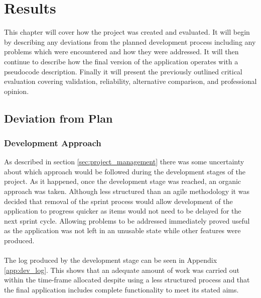 \section{Results}
	This chapter will cover how the project was created and evaluated. It will begin by describing any deviations from the planned development process including any problems which were encountered and how they were addressed. It will then continue to describe how the final version of the application operates with a pseudocode description. Finally it will present the previously outlined critical evaluation covering validation, reliability, alternative comparison, and professional opinion.
	\subsection{Deviation from Plan}
		\subsubsection{Development Approach}
			As described in section \ref{sec:project_management} there was some uncertainty about which approach would be followed during the development stages of the project. As it happened, once the development stage was reached, an organic approach was taken. Although less structured than an agile methodology it was decided that removal of the sprint process would allow development of the application to progress quicker as items would not need to be delayed for the next sprint cycle. Allowing problems to be addressed immediately proved useful as the application was not left in an unusable state while other features were produced.
			\\\\
			The log produced by the development stage can be seen in Appendix \ref{app:dev_log}. This shows that an adequate amount of work was carried out within the time-frame allocated despite using a less structured process and that the final application includes complete functionality to meet its stated aims.
